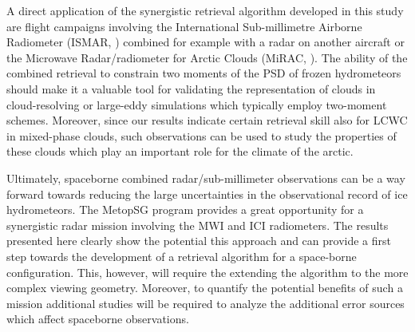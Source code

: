 \documentclass[journal abbreviation, manuscript]{copernicus}
\begin{document}
A direct application of the synergistic retrieval algorithm developed in this
study are flight campaigns involving the International Sub-millimetre Airborne
Radiometer (ISMAR, \citet{fox17}) combined for example with a radar on another
aircraft or the Microwave Radar/radiometer for Arctic Clouds (MiRAC,
\citet{mech19}). The ability of the combined retrieval to constrain two moments
of the PSD of frozen hydrometeors should make it a valuable tool for validating
the representation of clouds in cloud-resolving or large-eddy simulations which
typically employ two-moment schemes. Moreover, since our results indicate
certain retrieval skill also for LCWC in mixed-phase clouds, such
observations can be used to study the properties of these clouds which play an
important role for the climate of the arctic.

Ultimately, spaceborne combined radar/sub-millimeter observations can be a way
forward towards reducing the large uncertainties in the observational record of
ice hydrometeors. The MetopSG program provides a great opportunity for a
synergistic radar mission involving the MWI and ICI radiometers. The results
presented here clearly show the potential this approach and can provide a first
step towards the development of a retrieval algorithm for a space-borne
configuration. This, however, will require the extending the algorithm to the
more complex viewing geometry. Moreover, to quantify the potential benefits of
such a mission additional studies will be required to analyze the additional
error sources which affect spaceborne observations.






\end{document}
